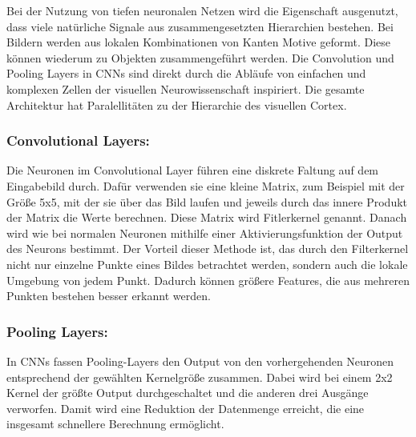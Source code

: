 \documentclass[runningheads,a4paper]{llncs}[2015/06/24]
\begin{document}
Bei der Nutzung von tiefen neuronalen Netzen wird die Eigenschaft ausgenutzt, dass viele natürliche Signale aus zusammengesetzten Hierarchien bestehen. Bei Bildern werden aus lokalen Kombinationen von Kanten Motive geformt. Diese können wiederum zu Objekten zusammengeführt werden. Die Convolution und Pooling Layers in CNNs sind direkt durch die Abläufe von einfachen und komplexen Zellen der visuellen Neurowissenschaft inspiriert. Die gesamte Architektur hat Paralellitäten zu der Hierarchie des visuellen Cortex. 

\subsubsection*{Convolutional Layers:}
Die Neuronen im Convolutional Layer führen eine diskrete Faltung auf dem Eingabebild durch. Dafür verwenden sie eine kleine Matrix, zum Beispiel mit der Größe 5x5, mit der sie über das Bild laufen und jeweils durch das innere Produkt der Matrix die Werte berechnen. Diese Matrix wird Fitlerkernel genannt. Danach wird wie bei normalen Neuronen mithilfe einer Aktivierungsfunktion der Output des Neurons bestimmt. Der Vorteil dieser Methode ist, das durch den Filterkernel nicht nur einzelne Punkte eines Bildes betrachtet werden, sondern auch die lokale Umgebung von jedem Punkt. Dadurch können größere Features, die aus mehreren Punkten bestehen besser erkannt werden.

\subsubsection*{Pooling Layers:}
In CNNs fassen Pooling-Layers den Output von den vorhergehenden Neuronen entsprechend der gewählten Kernelgröße zusammen. Dabei wird bei einem 2x2 Kernel der größte Output durchgeschaltet und die anderen drei Ausgänge verworfen. Damit wird eine Reduktion der Datenmenge erreicht, die eine insgesamt schnellere Berechnung ermöglicht.
\end{document}
